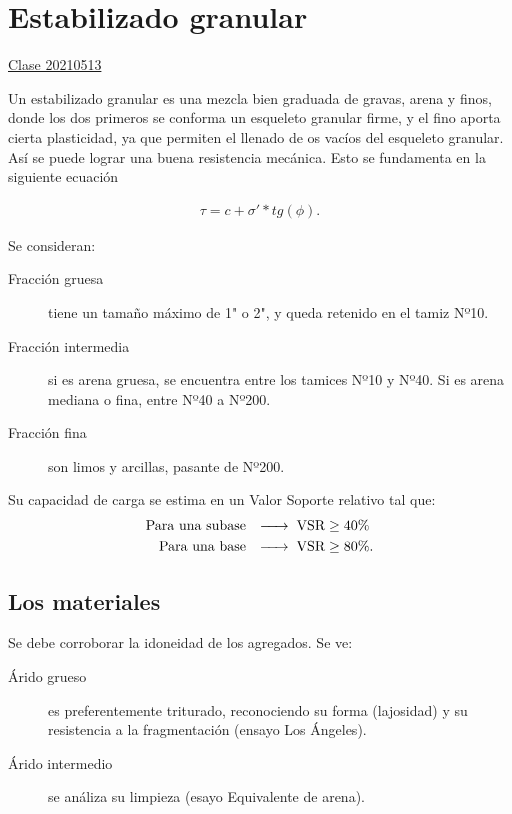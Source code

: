 \documentclass[../main.tex]{subfiles}
\begin{document}
\section{Estabilizado granular}

\href{https://youtu.be/1-kH3FTW_-Q}{Clase 20210513}

Un estabilizado granular es una mezcla bien graduada de gravas, arena y finos,
donde los dos primeros se conforma un esqueleto granular firme, y el fino aporta
cierta plasticidad, ya que permiten el llenado de os vacíos del esqueleto 
granular. Así se puede lograr una buena resistencia mecánica.
Esto se fundamenta en la siguiente ecuación

\begin{align*}
  \tau = c + \sigma' * tg(\phi)
.\end{align*}

Se consideran:

\begin{description}
  \item[Fracción gruesa] tiene un tamaño máximo de 1" o 2", y queda retenido en
    el tamiz Nº10.
  \item[Fracción intermedia] si es arena gruesa, se encuentra entre los tamices
    Nº10 y Nº40. Si es arena mediana o fina, entre Nº40 a Nº200.
  \item[Fracción fina] son limos y arcillas, pasante de Nº200.
\end{description}

Su capacidad de carga se estima en un Valor Soporte relativo tal que:
\begin{align*}
  \text{Para una subase} & \hspace{0.25cm} \xrightarrow{\hspace*{0.5cm}} \hspace{0.1cm} \text{VSR} \geq 40\% \\
  \text{Para una base} & \hspace{0.25cm} \xrightarrow{\hspace*{0.5cm}} \hspace{0.1cm} \text{VSR} \geq 80\%
.\end{align*}

\subsection{Los materiales}

Se debe corroborar la idoneidad de los agregados. Se ve:

\begin{description}
  \item[Árido grueso] es preferentemente triturado, reconociendo su forma (lajosidad)
    y su resistencia a la fragmentación (ensayo Los Ángeles).
  \item[Árido intermedio] se análiza su limpieza (esayo Equivalente de arena).
\end{description}
\end{document}
